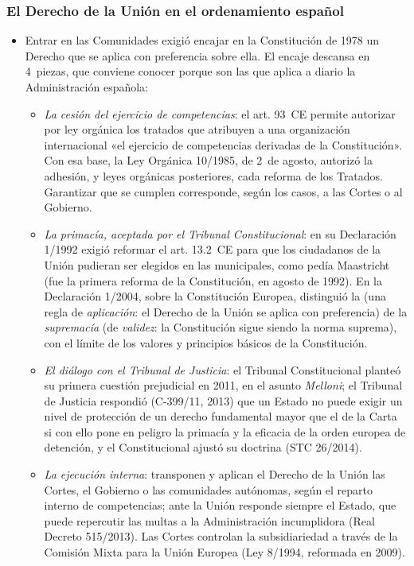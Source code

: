 \documentclass[11pt]{article}
\begin{document}
\subsubsection{El Derecho de la Unión en el ordenamiento español}\label{sec:espana}

\begin{itemize}
\item Entrar en las Comunidades exigió encajar en la Constitución de 1978 un Derecho que se aplica con preferencia sobre ella. El encaje descansa en 4~piezas, que conviene conocer porque son las que aplica a diario la Administración española:
  \begin{itemize}
  \item \emph{La cesión del ejercicio de competencias}: el art. 93~CE permite autorizar por ley orgánica los tratados que atribuyen a una organización internacional «el ejercicio de competencias derivadas de la Constitución». Con esa base, la Ley Orgánica 10/1985, de 2~de agosto, autorizó la adhesión, y leyes orgánicas posteriores, cada reforma de los Tratados. Garantizar que se cumplen corresponde, según los casos, a las Cortes o al Gobierno.
  \item \emph{La primacía, aceptada por el Tribunal Constitucional}: en su Declaración 1/1992 exigió reformar el art. 13.2~CE para que los ciudadanos de la Unión pudieran ser elegidos en las municipales, como pedía Maastricht (fue la primera reforma de la Constitución, en agosto de 1992). En la Declaración 1/2004, sobre la Constitución Europea, distinguió la  (una regla de \emph{aplicación}: el Derecho de la Unión se aplica con preferencia) de la \emph{supremacía} (de \emph{validez}: la Constitución sigue siendo la norma suprema), con el límite de los valores y principios básicos de la Constitución.
  \item \emph{El diálogo con el Tribunal de Justicia}: el Tribunal Constitucional planteó su primera cuestión prejudicial en 2011, en el asunto \emph{Melloni}; el Tribunal de Justicia respondió (C-399/11, 2013) que un Estado no puede exigir un nivel de protección de un derecho fundamental mayor que el de la Carta si con ello pone en peligro la primacía y la eficacia de la orden europea de detención, y el Constitucional ajustó su doctrina (STC 26/2014).
  \item \emph{La ejecución interna}: transponen y aplican el Derecho de la Unión las Cortes, el Gobierno o las comunidades autónomas, según el reparto interno de competencias; ante la Unión responde siempre el Estado, que puede repercutir las multas a la Administración incumplidora (Real Decreto 515/2013). Las Cortes controlan la subsidiariedad a través de la Comisión Mixta para la Unión Europea (Ley 8/1994, reformada en 2009).
  \end{itemize}
\end{itemize}
\end{document}
